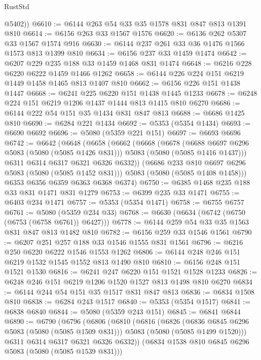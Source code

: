 \begin{lexlean}{RustStd}
\begin{coremodule}
        @5402))
@6610 := @6144 @263 @54 @33 @35 @1578 @831 @847 @813 @1391 @810
@6614 := @6156 @263 @33 @1567 @1576
@6620 := @6136 @262 @5307 @33 @1567 @1574 @916
@6630 := @6144 @237 @261 @33 @36 @1476 @1566 @1573 @813 @1399 @810
@6634 := @6156 @237 @33 @1459 @1474
@6642 := @6207 @229 @235 @188 @33 @1459 @1468 @831 @1474
@6648 := @6216 @228 @6220 @6222 @1459 @1466 @1262
@6658 := @6144 @226 @224 @151 @6219 @1449 @1458 @1465 @813 @1407 @810
@6662 := @6156 @226 @151 @1438 @1447
@6668 := @6241 @225 @6220 @151 @1438 @1445 @1233
@6678 := @6248 @224 @151 @6219 @1206 @1437 @1444 @813 @1415 @810 @6270
@6686 := @6144 @222 @54 @151 @35 @1434 @831 @847 @813
@6688 := @6686 @1425 @810
@6690 := @6284 @221 @1434
@6692 := @5353 (@5354 @1434)
@6693 := @6690 @6692
@6696 := @5080 (@5359 @221 @151)
@6697 := @6693 @6696
@6742 := @6642
    (@6648
      (@6658
        (@6662
          (@6668
            (@6678
              (@6688 @6697 @6296 @5083 (@5080 (@5085 @1426 @831)))
              @5083
              (@5080 (@5085 @1416 @1437)))
            @6311
            @6314
            @6317
            @6321
            @6326
            @6332))
        (@6686 @233 @810 @6697 @6296 @5083 (@5080 (@5085 @1452 @831)))
        @5083
        (@5080 (@5085 @1408 @1458)))
      @6353
      @6356
      @6359
      @6363
      @6368
      @6374)
@6750 := @6385 @1468 @235 @188 @33 @831 @1471 @831 @1279
@6753 := @6399 @235 @33 @1471
@6755 := @6403 @234 @1471
@6757 := @5353 (@5354 @1471)
@6758 := @6755 @6757
@6761 := @5080 (@5359 @234 @33)
@6768 := @6630 (@6634 (@6742 (@6750 (@6753 (@6758 @6761)) @6427)))
@6778 := @6144 @259 @54 @33 @35 @1563 @831 @847 @813 @1482 @810
@6782 := @6156 @259 @33 @1546 @1561
@6790 := @6207 @251 @257 @188 @33 @1546 @1555 @831 @1561
@6796 := @6216 @250 @6220 @6222 @1546 @1553 @1262
@6806 := @6144 @248 @246 @151 @6219 @1532 @1545 @1552 @813 @1490 @810
@6810 := @6156 @248 @151 @1521 @1530
@6816 := @6241 @247 @6220 @151 @1521 @1528 @1233
@6826 := @6248 @246 @151 @6219 @1206 @1520 @1527 @813 @1498 @810 @6270
@6834 := @6144 @244 @54 @151 @35 @1517 @831 @847 @813
@6836 := @6834 @1508 @810
@6838 := @6284 @243 @1517
@6840 := @5353 (@5354 @1517)
@6841 := @6838 @6840
@6844 := @5080 (@5359 @243 @151)
@6845 := @6841 @6844
@6890 := @6790
    (@6796
      (@6806
        (@6810
          (@6816
            (@6826
              (@6836 @6845 @6296 @5083 (@5080 (@5085 @1509 @831)))
              @5083
              (@5080 (@5085 @1499 @1520)))
            @6311
            @6314
            @6317
            @6321
            @6326
            @6332))
        (@6834 @1538 @810 @6845 @6296 @5083 (@5080 (@5085 @1539 @831)))

\end{coremodule}
\end{lexlean}
